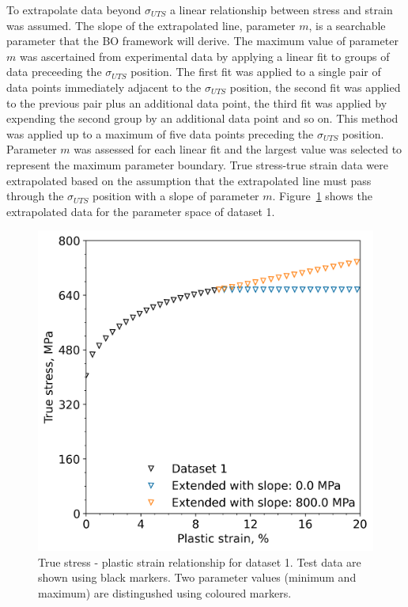 \documentclass[preprint, review, 12pt]{elsarticle}
\begin{document}
	To extrapolate data beyond $\sigma_{UTS}$ a linear relationship between stress and strain was assumed.
	The slope of the extrapolated line, parameter $m$, is a searchable parameter that the BO framework will derive.
	The maximum value of parameter $m$ was ascertained from experimental data by applying a linear fit to groups of data preceeding the $\sigma_{UTS}$ position.
	The first fit was applied to a single pair of data points immediately adjacent to the $\sigma_{UTS}$ position, the second fit was applied to the previous pair plus an additional data point, the third fit was applied by expending the second group by an additional data point and so on.
	This method was applied up to a maximum of five data points preceding the $\sigma_{UTS}$ position.
	Parameter $m$ was assessed for each linear fit and the largest value was selected to represent the maximum parameter boundary.
	True stress-true strain data were extrapolated based on the assumption that the extrapolated line must pass through the $\sigma_{UTS}$ position with a slope of parameter $m$.
	Figure~\ref{fig:extending_uts} shows the extrapolated data for the parameter space of dataset 1.
	\begin{figure}[!htbp]
		\centering
		\includegraphics[width=\linewidth, height=0.4\textheight, keepaspectratio]{ABAQUS_SLOPE_COMPARISON}
		\caption{True stress - plastic strain relationship for dataset 1. Test data are shown using black markers. Two parameter values (minimum and maximum) are distingushed using coloured markers.}
		\label{fig:extending_uts}
	\end{figure}
\end{document}
